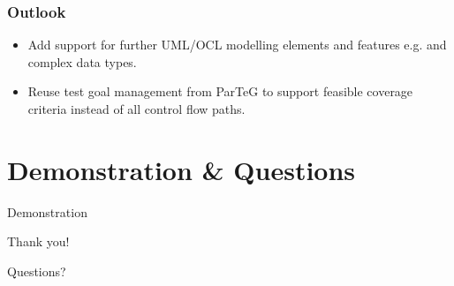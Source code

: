 \documentclass{beamer}
\begin{document}
\begin{frame}
\frametitle{Outlook}
\begin{itemize}
  \item Add support for further UML/OCL modelling elements and features e.g.
   and complex data types.
  \item Reuse test goal management from ParTeG to support feasible coverage
  criteria instead of all control flow paths.
\end{itemize}
\end{frame}

\section{Demonstration \& Questions}
\begin{frame}
\begin{block}{}
\begin{center}
\Huge{Demonstration}
\end{center}
\end{block}
\end{frame}


\begin{frame}
\begin{block}{Thank you!}
\begin{center}
\Huge{Questions?}
\end{center}
\end{block}
\end{frame}


\end{document}
